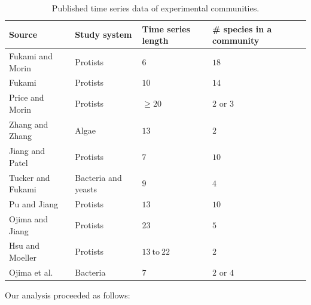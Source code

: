 \documentclass[12pt, class=article, crop=false]{standalone}
\begin{document}
\begin{table}
    \flushleft
    \caption{Published time series data of experimental communities.}
    \begin{tabular}{llll}
         Source & Study system & Time series length & \# species in a community\\
         \hline
         Fukami and Morin \citep{fukami_productivity-biodiversity_2003} & Protists & $6$ & $18$\\
         Fukami \citep{fukami_assembly_2004} & Protists & $10$ & $14$\\
         Price and Morin \citep{price_colonization_2004} & Protists & $\ge 20$ & $2$ or $3$ \\
         Zhang and Zhang \citep{zhang_colonization_2007} & Algae & $13$ & $2$\\
         Jiang and Patel \citep{jiang_community_2008} & Protists & $7$ & $10$\\
         Tucker and Fukami \citep{tucker_environmental_2014} & Bacteria and yeasts & $9$ & $4$\\
         Pu and Jiang \citep{pu_dispersal_2015} & Protists & $13$ & $10$\\
         Ojima and Jiang \citep{ojima_interactive_2017} & Protists & $23$ & $5$\\
         Hsu and Moeller \citep{hsu_metabolic_2021} & Protists & $13~\mbox{to}~22$ & $2$\\
         Ojima et al. \citep{ojima_priority_2022} & Bacteria & $7$ & $2$ or $4$\\
         \hline
    \end{tabular}
    \label{tab:expdata}
\end{table}

Our analysis proceeded as follows:
\end{document}
